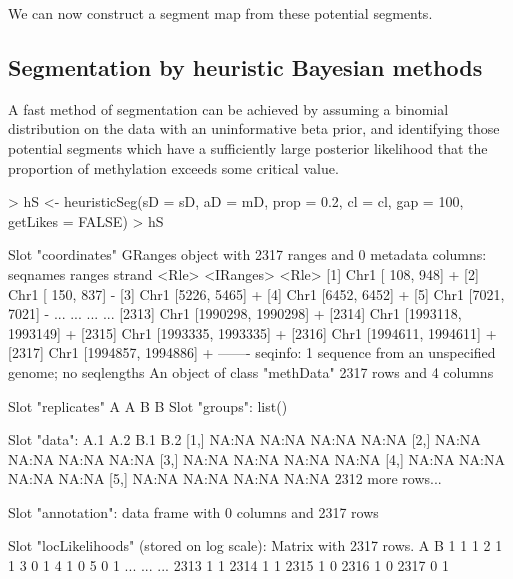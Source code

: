 \documentclass[a4paper]{article}
\begin{document}
We can now construct a segment map from these potential segments.

\subsection*{Segmentation by heuristic Bayesian methods}

A fast method of segmentation can be achieved by assuming a binomial distribution on the data with an uninformative beta prior, and identifying those potential segments which have a sufficiently large posterior likelihood that the proportion of methylation exceeds some critical value.

\begin{Schunk}
\begin{Sinput}
> hS <- heuristicSeg(sD = sD, aD = mD, prop = 0.2, cl = cl, gap = 100, getLikes = FALSE)
> hS
\end{Sinput}
\begin{Soutput}
Slot "coordinates"
GRanges object with 2317 ranges and 0 metadata columns:
         seqnames             ranges strand
            <Rle>          <IRanges>  <Rle>
     [1]     Chr1       [ 108,  948]      +
     [2]     Chr1       [ 150,  837]      -
     [3]     Chr1       [5226, 5465]      +
     [4]     Chr1       [6452, 6452]      +
     [5]     Chr1       [7021, 7021]      -
     ...      ...                ...    ...
  [2313]     Chr1 [1990298, 1990298]      +
  [2314]     Chr1 [1993118, 1993149]      +
  [2315]     Chr1 [1993335, 1993335]      +
  [2316]     Chr1 [1994611, 1994611]      +
  [2317]     Chr1 [1994857, 1994886]      +
  -------
  seqinfo: 1 sequence from an unspecified genome; no seqlengths
An object of class "methData"
2317 rows and 4 columns

Slot "replicates"
A A B B
Slot "groups":
list()

Slot "data":
     A.1   A.2   B.1   B.2  
[1,] NA:NA NA:NA NA:NA NA:NA
[2,] NA:NA NA:NA NA:NA NA:NA
[3,] NA:NA NA:NA NA:NA NA:NA
[4,] NA:NA NA:NA NA:NA NA:NA
[5,] NA:NA NA:NA NA:NA NA:NA
2312 more rows...

Slot "annotation":
data frame with 0 columns and 2317 rows

Slot "locLikelihoods" (stored on log scale):
Matrix with  2317  rows.
       A   B
1      1   1
2      1   1
3      0   1
4      1   0
5      0   1
...  ... ...
2313   1   1
2314   1   1
2315   1   0
2316   1   0
2317   0   1
\end{Soutput}
\end{Schunk}
\end{document}
